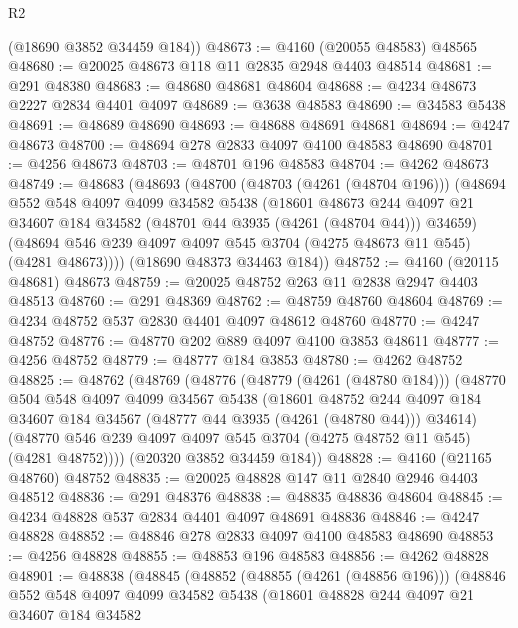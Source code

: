 \begin{lexlean}{R2}
\begin{coremodule}
      (@18690 @3852 @34459 @184))
@48673 := @4160 (@20055 @48583) @48565
@48680 := @20025 @48673 @118 @11 @2835 @2948 @4403 @48514
@48681 := @291 @48380
@48683 := @48680 @48681 @48604
@48688 := @4234 @48673 @2227 @2834 @4401 @4097
@48689 := @3638 @48583
@48690 := @34583 @5438
@48691 := @48689 @48690
@48693 := @48688 @48691 @48681
@48694 := @4247 @48673
@48700 := @48694 @278 @2833 @4097 @4100 @48583 @48690
@48701 := @4256 @48673
@48703 := @48701 @196 @48583
@48704 := @4262 @48673
@48749 := @48683
    (@48693
      (@48700
        (@48703 (@4261 (@48704 @196)))
        (@48694
          @552
          @548
          @4097
          @4099
          @34582
          @5438
          (@18601
            @48673
            @244
            @4097
            @21
            @34607
            @184
            @34582
            (@48701 @44 @3935 (@4261 (@48704 @44)))
            @34659)
          (@48694 @546 @239 @4097 @4097 @545 @3704 (@4275 @48673 @11 @545) (@4281 @48673))))
      (@18690 @48373 @34463 @184))
@48752 := @4160 (@20115 @48681) @48673
@48759 := @20025 @48752 @263 @11 @2838 @2947 @4403 @48513
@48760 := @291 @48369
@48762 := @48759 @48760 @48604
@48769 := @4234 @48752 @537 @2830 @4401 @4097 @48612 @48760
@48770 := @4247 @48752
@48776 := @48770 @202 @889 @4097 @4100 @3853 @48611
@48777 := @4256 @48752
@48779 := @48777 @184 @3853
@48780 := @4262 @48752
@48825 := @48762
    (@48769
      (@48776
        (@48779 (@4261 (@48780 @184)))
        (@48770
          @504
          @548
          @4097
          @4099
          @34567
          @5438
          (@18601
            @48752
            @244
            @4097
            @184
            @34607
            @184
            @34567
            (@48777 @44 @3935 (@4261 (@48780 @44)))
            @34614)
          (@48770 @546 @239 @4097 @4097 @545 @3704 (@4275 @48752 @11 @545) (@4281 @48752))))
      (@20320 @3852 @34459 @184))
@48828 := @4160 (@21165 @48760) @48752
@48835 := @20025 @48828 @147 @11 @2840 @2946 @4403 @48512
@48836 := @291 @48376
@48838 := @48835 @48836 @48604
@48845 := @4234 @48828 @537 @2834 @4401 @4097 @48691 @48836
@48846 := @4247 @48828
@48852 := @48846 @278 @2833 @4097 @4100 @48583 @48690
@48853 := @4256 @48828
@48855 := @48853 @196 @48583
@48856 := @4262 @48828
@48901 := @48838
    (@48845
      (@48852
        (@48855 (@4261 (@48856 @196)))
        (@48846
          @552
          @548
          @4097
          @4099
          @34582
          @5438
          (@18601
            @48828
            @244
            @4097
            @21
            @34607
            @184
            @34582

\end{coremodule}
\end{lexlean}
